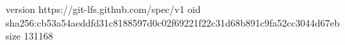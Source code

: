 version https://git-lfs.github.com/spec/v1
oid sha256:cb53a54aeddfd31c8188597d0c02f69221f22c31d68b891c9fa52cc3044d67eb
size 131168
